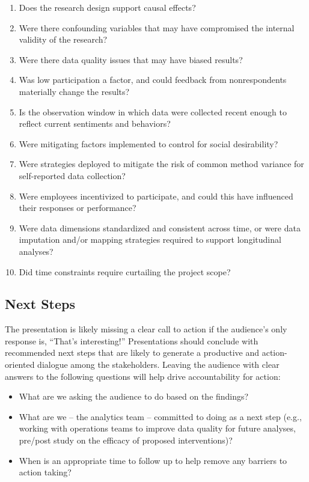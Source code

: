 \documentclass[
]{book}
\providecommand{\tightlist}{%
  \setlength{\itemsep}{0pt}\setlength{\parskip}{0pt}}
\begin{document}
\begin{enumerate}
\def\labelenumi{\arabic{enumi}.}
\tightlist
\item
  Does the research design support causal effects?
\item
  Were there confounding variables that may have compromised the internal validity of the research?
\item
  Were there data quality issues that may have biased results?
\item
  Was low participation a factor, and could feedback from nonrespondents materially change the results?
\item
  Is the observation window in which data were collected recent enough to reflect current sentiments and behaviors?
\item
  Were mitigating factors implemented to control for social desirability?
\item
  Were strategies deployed to mitigate the risk of common method variance for self-reported data collection?
\item
  Were employees incentivized to participate, and could this have influenced their responses or performance?
\item
  Were data dimensions standardized and consistent across time, or were data imputation and/or mapping strategies required to support longitudinal analyses?
\item
  Did time constraints require curtailing the project scope?
\end{enumerate}

\hypertarget{next-steps}{%
\subsection{Next Steps}\label{next-steps}}

The presentation is likely missing a clear call to action if the audience's only response is, ``That's interesting!'' Presentations should conclude with recommended next steps that are likely to generate a productive and action-oriented dialogue among the stakeholders. Leaving the audience with clear answers to the following questions will help drive accountability for action:

\begin{itemize}
\tightlist
\item
  What are we asking the audience to do based on the findings?
\item
  What are we -- the analytics team -- committed to doing as a next step (e.g., working with operations teams to improve data quality for future analyses, pre/post study on the efficacy of proposed interventions)?
\item
  When is an appropriate time to follow up to help remove any barriers to action taking?
\end{itemize}
\end{document}
